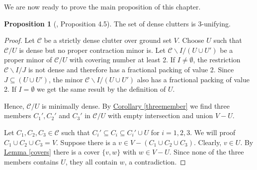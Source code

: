 \documentclass[a4paper, 12pt, twoside=false]{scrbook}
\theoremstyle{definition}
\newtheorem{proposition}[theorem]{Proposition}
\begin{document}
   We are now ready to prove the main proposition of this chapter.
   \begin{proposition}[\cite{restrictions}, Proposition 4.5]
       The set of dense clutters is 3-unifying.
   \end{proposition}

   \begin{proof}
       Let $\mathcal{C}$ be a strictly dense clutter over ground set $V$.
       Choose $U$ such that $\mathcal{C} / U$ is dense but no proper contraction minor is.
       Let $\mathcal{C} \backslash I / (U \cup U')$ be a proper minor of $\mathcal{C} /U$ with covering number at least 2.
       If $I \neq \emptyset$, the restriction $\mathcal{C} \backslash I / J$ is not dense and therefore has a fractional packing of value 2.
       Since $J \subseteq (U \cup U')$, the minor $\mathcal{C} \backslash I / (U \cup U')$ also has a fractional packing of value 2.
       If $I=\emptyset$ we get the same result by the definition of $U$.

       Hence, $\mathcal{C}/U$ is minimally dense.
       By \hyperref[threemember]{Corollary \ref*{threemember}} we find three members $C_1', C_2'$ and $C_3'$ in $\mathcal{C}/U$ with empty intersection and union $V - U$.

       Let $C_1, C_2, C_3 \in \mathcal{C}$ such that $C_i' \subseteq C_i \subseteq C_i' \cup U$ for $i=1,2,3$.
       We will proof $C_1 \cup C_2 \cup C_3 = V$.
       Suppose there is a $v \in V-(C_1 \cup C_2 \cup C_3)$.
       Clearly, $v \in U$.
       By \hyperref[covers]{Lemma \ref*{covers}} there is a cover $\{v,w\}$ with $w \in V-U$.
       Since none of the three members contains $U$, they all contain $w$, a contradiction.
   \end{proof}

   \printbibliography[title={References}]
   \printindex
\end{document}
